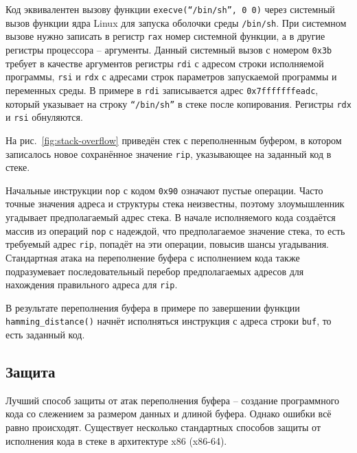 Код эквивалентен вызову функции \texttt{execve(``/bin/sh'', 0 0)} через системный вызов функции ядра Linux для запуска оболочки среды \texttt{/bin/sh}. При системном вызове нужно записать в регистр \texttt{rax} номер системной функции, а в другие регистры процессора -- аргументы. Данный системный вызов с номером \texttt{0x3b} требует в качестве аргументов регистры \texttt{rdi} с адресом строки исполняемой программы, \texttt{rsi} и \texttt{rdx} с адресами строк параметров запускаемой программы и переменных среды. В примере в \texttt{rdi} записывается адрес \texttt{0x7fffffffeadc}, который указывает на строку \texttt{``/bin/sh''} в стеке после копирования. Регистры \texttt{rdx} и \texttt{rsi} обнуляются.

На рис.~\ref{fig:stack-overflow} приведён стек с переполненным буфером, в котором записалось новое сохранённое значение \texttt{rip}, указывающее на заданный код в стеке.

Начальные инструкции \texttt{nop} с кодом \texttt{0x90} означают пустые операции. Часто точные значения адреса и структуры стека неизвестны, поэтому злоумышленник угадывает предполагаемый адрес стека. В начале исполняемого кода создаётся массив из операций \texttt{nop} с надеждой, что предполагаемое значение стека, то есть требуемый адрес \texttt{rip}, попадёт на эти операции, повысив шансы угадывания. Стандартная атака на переполнение буфера с исполнением кода также подразумевает последовательный перебор предполагаемых адресов для нахождения правильного адреса для \texttt{rip}.

В результате переполнения буфера в примере по завершении функции \texttt{hamming\_distance()} начнёт исполняться инструкция с адреса строки \texttt{buf}, то есть заданный код.


\subsection{Защита}

Лучший способ защиты от атак переполнения буфера -- создание программного кода со слежением за размером данных и длиной буфера. Однако ошибки всё равно происходят. Существует несколько стандартных способов защиты от исполнения кода в стеке в архитектуре x86 (x86-64).

